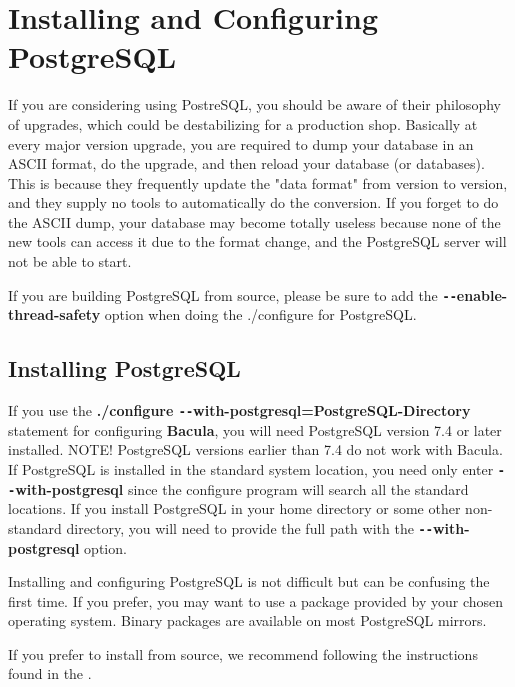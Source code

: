 
\chapter{Installing and Configuring PostgreSQL}
\label{PostgreSqlChapter}

If you are considering using PostreSQL, you should be aware
of their philosophy of upgrades, which could be 
destabilizing for a production shop.  Basically at every major version
upgrade, you are required to dump your database in an ASCII format, 
do the upgrade, and then reload your database (or databases). This is
because they frequently update the "data format" from version to   
version, and they supply no tools to automatically do the conversion.
If you forget to do the ASCII dump, your database may become totally
useless because none of the new tools can access it due to the format
change, and the PostgreSQL server will not be able to start.

If you are building PostgreSQL from source, please be sure to add
the {\bf \verb:--:enable-thread-safety} option when doing the ./configure
for PostgreSQL.  

\section{Installing PostgreSQL}

If you use the {\bf ./configure \verb:--:with-postgresql=PostgreSQL-Directory}
statement for configuring {\bf Bacula}, you will need PostgreSQL version 7.4
or later installed. NOTE! PostgreSQL versions earlier than 7.4 do not work
with Bacula. If PostgreSQL is installed in the standard system location, you
need only enter {\bf \verb:--:with-postgresql} since the configure program will
search all the standard locations. If you install PostgreSQL in your home
directory or some other non-standard directory, you will need to provide the
full path with the {\bf \verb:--:with-postgresql} option. 

Installing and configuring PostgreSQL is not difficult but can be confusing
the first time. If you prefer, you may want to use a package provided by your
chosen operating system. Binary packages are available on most PostgreSQL
mirrors. 

If you prefer to install from source, we recommend following the instructions
found in the 
. 

